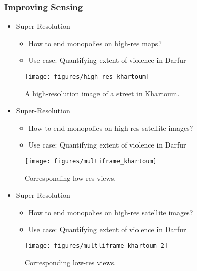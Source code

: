 \documentclass[10pt,mathserif]{beamer}
\begin{document}
\begin{frame}
  \frametitle{Improving Sensing}
  \begin{itemize}
  \item Super-Resolution
    \begin{itemize}
    \item How to end monopolies on high-res maps?
    \item Use case: Quantifying extent of violence in Darfur
    \end{itemize}
  \end{itemize} 
  \begin{figure}[ht]
    \centering
    \texttt{[image: figures/high\_res\_khartoum]}
    \caption{A high-resolution image of a street in Khartoum. \label{fig:label} }
  \end{figure}
\end{frame}

\begin{frame}
  \begin{itemize}
  \item Super-Resolution
    \begin{itemize}
    \item How to end monopolies on high-res satellite images?
    \item Use case: Quantifying extent of violence in Darfur
    \end{itemize}
  \end{itemize} 
  \begin{figure}[ht]
    \centering
    \texttt{[image: figures/multiframe\_khartoum]}
    \caption{Corresponding low-res views. \label{fig:label} }
  \end{figure}
\end{frame}

\begin{frame}
  \begin{itemize}
  \item Super-Resolution
    \begin{itemize}
    \item How to end monopolies on high-res satellite images?
    \item Use case: Quantifying extent of violence in Darfur
    \end{itemize}
  \end{itemize} 
  \begin{figure}[ht]
    \centering
    \texttt{[image: figures/multliframe\_khartoum\_2]}
    \caption{Corresponding low-res views. \label{fig:label} }
  \end{figure}
\end{frame}
\end{document}
